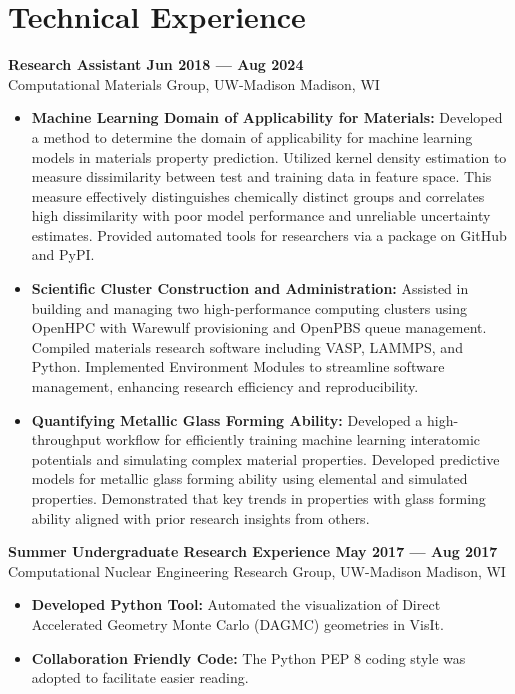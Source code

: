 \section{Technical Experience}

\noindent \textbf{Research Assistant \hfill Jun 2018 --- Aug 2024}\\
Computational Materials Group, UW-Madison \dotfill Madison, WI

\begin{itemize}
    \item \textbf{Machine Learning Domain of Applicability for Materials:} Developed a method to determine the domain of applicability for machine learning models in materials property prediction. Utilized kernel density estimation to measure dissimilarity between test and training data in feature space. This measure effectively distinguishes chemically distinct groups and correlates high dissimilarity with poor model performance and unreliable uncertainty estimates. Provided automated tools for researchers via a package on GitHub and PyPI.

    \item \textbf{Scientific Cluster Construction and Administration:} Assisted in building and managing two high-performance computing clusters using OpenHPC with Warewulf provisioning and OpenPBS queue management. Compiled materials research software including VASP, LAMMPS, and Python. Implemented Environment Modules to streamline software management, enhancing research efficiency and reproducibility.

    \item \textbf{Quantifying Metallic Glass Forming Ability:} Developed a high-throughput workflow for efficiently training machine learning interatomic potentials and simulating complex material properties. Developed predictive models for metallic glass forming ability using elemental and simulated properties. Demonstrated that key trends in properties with glass forming ability aligned with prior research insights from others.

\end{itemize}

\noindent \textbf{Summer Undergraduate Research Experience \hfill May 2017 --- Aug 2017}\\
Computational Nuclear Engineering Research Group, UW-Madison \dotfill Madison, WI

\begin{itemize}
    \item \textbf{Developed Python Tool:} Automated the visualization of Direct Accelerated Geometry Monte Carlo (DAGMC) geometries in VisIt.
    \item \textbf{Collaboration Friendly Code:} The Python PEP 8 coding style was adopted to facilitate easier reading.
\end{itemize}

